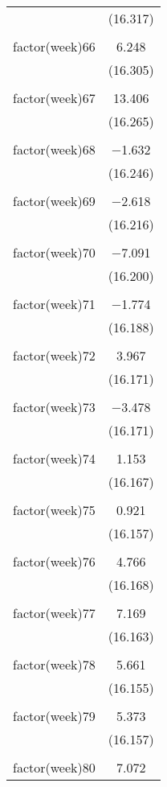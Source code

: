 \documentclass{article}
\begin{document}
\begin{table}[!htbp]
\begin{tabular}{@{\extracolsep{5pt}}lc}
  & (16.317) \\ 
  & \\ 
 factor(week)66 & 6.248 \\ 
  & (16.305) \\ 
  & \\ 
 factor(week)67 & 13.406 \\ 
  & (16.265) \\ 
  & \\ 
 factor(week)68 & $-$1.632 \\ 
  & (16.246) \\ 
  & \\ 
 factor(week)69 & $-$2.618 \\ 
  & (16.216) \\ 
  & \\ 
 factor(week)70 & $-$7.091 \\ 
  & (16.200) \\ 
  & \\ 
 factor(week)71 & $-$1.774 \\ 
  & (16.188) \\ 
  & \\ 
 factor(week)72 & 3.967 \\ 
  & (16.171) \\ 
  & \\ 
 factor(week)73 & $-$3.478 \\ 
  & (16.171) \\ 
  & \\ 
 factor(week)74 & 1.153 \\ 
  & (16.167) \\ 
  & \\ 
 factor(week)75 & 0.921 \\ 
  & (16.157) \\ 
  & \\ 
 factor(week)76 & 4.766 \\ 
  & (16.168) \\ 
  & \\ 
 factor(week)77 & 7.169 \\ 
  & (16.163) \\ 
  & \\ 
 factor(week)78 & 5.661 \\ 
  & (16.155) \\ 
  & \\ 
 factor(week)79 & 5.373 \\ 
  & (16.157) \\ 
  & \\ 
 factor(week)80 & 7.072 \\ 

\end{tabular}
\end{table}
\end{document}
